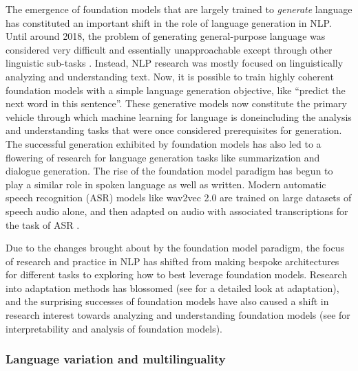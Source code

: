 The emergence of foundation models that are largely trained to \textit{generate} language has constituted an important shift in the role of language generation in NLP. 
Until around 2018, the problem of generating general-purpose language was considered very difficult and
essentially unapproachable except through other linguistic sub-tasks \citep{paris2013natural}.
Instead,  NLP research was mostly focused on linguistically analyzing and understanding text. 
Now, it is possible to train highly coherent foundation models with a simple language generation objective, like ``predict the next word in this sentence''. These generative models now constitute the primary vehicle through which machine learning for language is done\dash{}including the analysis and understanding tasks that were once considered prerequisites for generation. 
The successful generation exhibited by foundation models has also led to a flowering of research for language generation tasks like summarization and dialogue generation. 
The rise of the foundation model paradigm has begun to play a similar role in spoken language as well as written.  Modern automatic speech recognition (ASR) models like wav2vec 2.0 are trained on large datasets of speech audio alone, and then adapted on audio with associated transcriptions for the task of ASR \citep{wav2vec2}.

Due to the changes brought about by the foundation model paradigm, the focus of research and practice in NLP has shifted from making bespoke architectures for different tasks to exploring how to best leverage foundation models. Research into adaptation methods has blossomed 
(see  for a detailed look at adaptation), and the surprising successes of foundation models have also caused a shift in research interest towards analyzing and understanding foundation models
(see  for interpretability and analysis of foundation models).

\subsubsection{Language variation and multilinguality}

